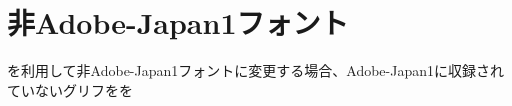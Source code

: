 \documentclass[uplatex, dvipdfmx, jis2004]{jlreq}
\begin{document}
\section{非Adobe-Japan1フォント}

を利用して非Adobe-Japan1フォントに変更する場合、Adobe-Japan1に収録されていないグリフをを

👀🤔
\end{document}
